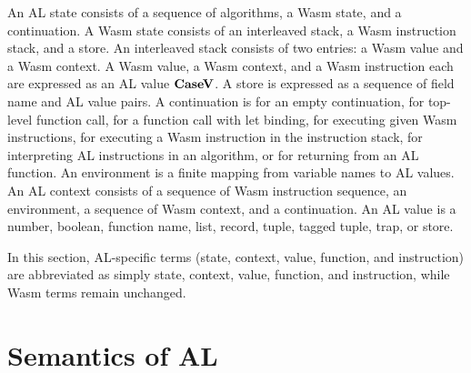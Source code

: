 An AL state consists of a sequence of algorithms, a Wasm state, and a
continuation.
A Wasm state consists of an interleaved stack, a Wasm instruction stack, and a
store.
An interleaved stack consists of two entries: a Wasm value and a Wasm context.
A Wasm value, a Wasm context, and a Wasm instruction each are expressed as an
AL value $\textbf{CaseV}$.
A store is expressed as a sequence of field name and AL value pairs.
A continuation is \mt{} for an empty continuation, \toplevelcall{} for
top-level function call, \call{} for a function call with let binding, \exe{}
for executing given Wasm instructions, \wasm{} for executing a Wasm instruction
in the instruction stack, \algo{} for interpreting AL instructions in an
algorithm, or \ret{} for returning from an AL function.
An environment is a finite mapping from variable names to AL values.
An AL context consists of a sequence of Wasm instruction sequence, an
environment, a sequence of Wasm context, and a continuation.
An AL value is a number, boolean, function name, list, record, tuple, tagged tuple,
trap, or store.


In this section, AL-specific terms (state, context, value, function, and
instruction) are abbreviated as simply state, context, value, function, and
instruction, while Wasm terms remain unchanged.




\newpage
\section{Semantics of AL}
\label{semantics}


